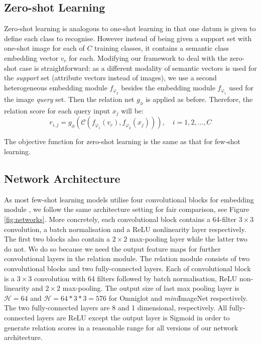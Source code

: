 \documentclass[10pt,twocolumn,letterpaper]{article}
\begin{document}
\subsection{Zero-shot Learning}\label{method:ZSL}
Zero-shot learning is analogous to one-shot learning in that one datum is given to define each class to recognise. However instead of being given a support set with one-shot image for each of $C$ training classes, it contains a semantic class embedding vector $v_{c}$ for each.
Modifying our framework to deal with the zero-shot case is straightforward: as a different modality of semantic vectors is used for the {\em support} set (\eg attribute vectors instead of images), we use a second heterogeneous embedding module  $f_{\varphi_{2}}$ besides the embedding module $f_{\varphi_{1}}$ used for the image {\em query} set. Then the relation net $g_\phi$ is applied as before. Therefore, the relation score for each query input $x_{j}$ will be:
\begin{equation}
r_{i,j} = g_{\phi} (\mathcal{C}(f_{\varphi_{1}}(v_{c}), f_{\varphi_{2}}(x_{j}))), \quad i=1,2,\dots,C
\end{equation}

The objective function for zero-shot learning is the same as that for few-shot learning.


\subsection{Network Architecture}\label{method:architecture}





As most few-shot learning models utilise four convolutional blocks for embedding module \cite{vinyals2016matching, snell2017prototypical}, we follow the same architecture setting for fair comparison, see Figure \ref{fig:networks}.
More concretely, each convolutional block contains a 64-filter $3 \times 3$ convolution, a batch normalisation and a ReLU nonlinearity layer respectively.  The first two blocks also contain a $2 \times 2$ max-pooling layer while the latter two do not. We do so because we need the output feature maps for further convolutional layers in the relation module. 
The relation module consists of two convolutional blocks and two fully-connected layers. Each of convolutional block is a  $3 \times 3$ convolution with 64 filters followed by batch normalisation, ReLU non-linearity and $2 \times 2$ max-pooling. The output size of last max pooling layer is $\mathcal{H} = 64$ and $\mathcal{H} = 64*3*3 = 576$ for Omniglot and \textit{mini}ImageNet respectively. The two fully-connected layers are 8 and 1 dimensional, respectively.  
All fully-connected layers are ReLU except the output layer is Sigmoid in order to generate relation scores in a {reasonable} range for all versions of our network architecture. 
\end{document}
